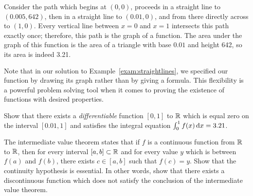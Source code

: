 \documentclass{watsonbook}
\begin{document}
  \begin{solution}
    \begin{minipage}[t]{0.78\textwidth} 
    Consider the path which begins at $(0,0)$, proceeds in a straight
    line to $(0.005,642)$, then in a straight line to $(0.01,0)$, and
    from there directly across to $(1,0)$. Every vertical line between
    $x=0$ and $x=1$ intersects this path exactly once; therefore, this
    path is the graph of a function. The area under the graph of this
    function is the area of a triangle with base $0.01$ and height
    642, so its area is indeed 3.21.
  \end{minipage} \hfill 
  \begin{minipage}[t]{0.20\textwidth}
    \raisebox{\dimexpr -\height + 1.5 ex \relax}{\usebox{\asybox}}
  \end{minipage}
\end{solution}

Note that in our solution to Example~\ref{exam:straightlines}, we
specified our function by drawing its graph rather than by giving a
formula. This flexibility is a powerful problem solving tool when it
comes to proving the existence of functions with desired properties.

\begin{exercise}{}{}
  Show that there exists a \textit{differentiable} function $[0,1]$ to
  $\mathbb{R}$ which is equal zero on the interval $[0.01,1]$ and satisfies
  the integral equation $\int_0^1 f(x) \, \mathrm{d} x = 3.21$.
\end{exercise}

\begin{exercise}{}{}
  The intermediate value theorem states that if $f$ is a continuous
  function from $\mathbb{R}$ to $\mathbb{R}$, then for every interval $[a,b] \subset
  \mathbb{R}$ and for every value $y$ which is between $f(a)$ and $f(b)$,
  there exists $c \in [a,b]$ such that $f(c) = y$. Show that the
  continuity hypothesis is essential. In other words, show that there
  exists a discontinuous function which does not satisfy the
  conclusion of the intermediate value theorem. 
\end{exercise}
\end{document}
